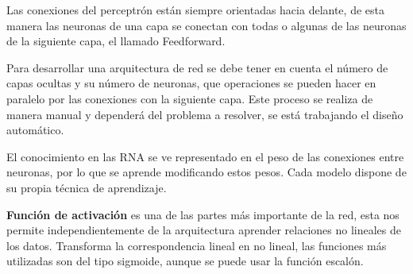 \documentclass[12pt, twoside, openright]{report} %
\begin{document}
Las conexiones del perceptrón están siempre orientadas hacia delante, de esta manera las neuronas de una capa se conectan con todas o algunas de las neuronas de la siguiente capa, el llamado Feedforward.

Para desarrollar una arquitectura de red se debe tener en cuenta el número de capas ocultas y su número de neuronas, que operaciones se pueden hacer en paralelo por las conexiones con la siguiente capa. Este proceso se realiza de manera manual y dependerá del problema a resolver, se está trabajando el diseño automático.

El conocimiento en las RNA se ve representado en el peso de las conexiones entre neuronas, por lo que se aprende modificando estos pesos. Cada modelo dispone de su propia técnica de aprendizaje.

\textbf{Función de activación} es una de las partes más importante de la red, esta nos permite independientemente de la arquitectura aprender relaciones no lineales de los datos. Transforma la correspondencia lineal en no lineal, las funciones más utilizadas son del tipo sigmoide, aunque se puede usar la función escalón.
\end{document}
